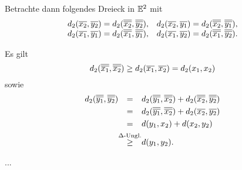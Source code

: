 \begin{beweis}
\begin{description}
\begin{description}
		Betrachte dann folgendes Dreieck in $\mathbb{E}^2$ mit
		\[
			\begin{array}{cc}
				d_2(\overline{x_2},\overline{y_2}) = d_2(\overline{\overline{x_2}},\overline{\overline{y_2}}), &
				d_2(\overline{x_2},\overline{y_1}) = d_2(\overline{\overline{x_2}},\overline{\overline{y_1}}), \\
				d_2(\overline{x_1},\overline{y_1}) = d_2(\overline{\overline{x_1}},\overline{\overline{y_1}}), &
				d_2(\overline{x_1},\overline{y_2}) = d_2(\overline{\overline{x_1}},\overline{\overline{y_2}}).			
			\end{array}
		\]
		
		\begin{figure}[h]
			\centering
		\end{figure}
		
		Es gilt
		\[
			d_2(\overline{\overline{x_1}},\overline{\overline{x_2}}) \geq d_2(\overline{x_1},\overline{x_2}) = d_2(x_1,x_2)
		\]
		sowie
		\begin{align*}
			d_2(\ol{\ol{y_1}},\ol{\ol{y_2}}) &\stack{}{=} d_2(\ol{\ol{y_1}},\ol{\ol{x_2}}) + d_2(\ol{\ol{x_2}},\ol{\ol{y_2}}) \\
			&\stack{}{=} d_2(\ol{\ol{y_1}},\ol{\ol{x_2}}) + d_2(\ol{x_2},\ol{y_2}) \\
			&\stack{}{=} d(y_1,x_2) + d(x_2,y_2) \\
			&\stack{\Delta\text{-Ungl.}}{\geq} d(y_1,y_2).
		\end{align*}
	\end{description}
	\item[\bewrueck] ...
	\end{description}
\end{beweis}
\cleardoubleoddemptypage